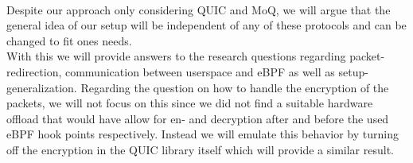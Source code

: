 \\
Despite our approach only considering QUIC and MoQ, we will argue that the general idea of our setup will be independent of
any of these protocols and can be changed to fit ones needs.
\\
With this we will provide answers to the research questions regarding packet-redirection, communication between userspace and eBPF
as well as setup-generalization.
Regarding the question on how to handle the encryption of the packets, we will not focus on this since we did not find a suitable
hardware offload that would have allow for en- and decryption after and before the used eBPF hook points respectively.
Instead we will emulate this behavior by turning off the encryption in the QUIC library itself which will provide a similar result.

